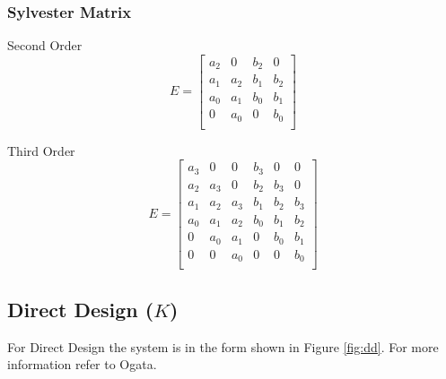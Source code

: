 \documentclass{article}
\begin{document}
\subsubsection{Sylvester Matrix}
\label{sec:sylvester}

Second Order
\[
E=
\begin{bmatrix}
	a_2 & 0 & b_2 & 0 \\
	a_1 & a_2 & b_1 & b_2 \\
	a_0 & a_1 & b_0 & b_1 \\
	0 & a_0 & 0 & b_0 \\
\end{bmatrix}
\]

Third Order
\[
E=
\begin{bmatrix}
	a_3 & 0 & 0 & b_3 & 0 & 0 \\
	a_2 & a_3 & 0 & b_2 & b_3 & 0 \\
	a_1 & a_2 & a_3 & b_1 & b_2 & b_3 \\
	a_0 & a_1 & a_2 & b_0 & b_1 & b_2 \\
	0 & a_0 & a_1 & 0 & b_0 & b_1 \\
	0 & 0 & a_0 & 0 & 0 & b_0 \\
\end{bmatrix}
\]


\clearpage
\subsection{Direct Design ($K$)}
\label{sec:dd}

For Direct Design the system is in the form shown in Figure \ref{fig:dd}.
For more information refer to Ogata\autocite[Pg. 517]{ogata1995discrete}.
\end{document}
